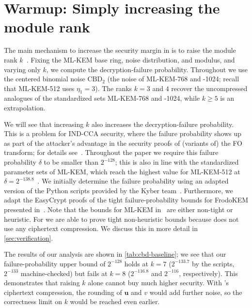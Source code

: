 \section{Warmup: Simply increasing the module rank}
\label{sec:warmup}
The main mechanism to increase the security margin in \kyber is to raise
the module rank $k$~\cite{kyberround1}. Fixing the ML-KEM base ring, noise distribution, and
modulus, and varying only $k$, we compute the decryption-failure probability.
Throughout we use the centered binomial noise $\mathrm{CBD}_2$
(the noise of ML-KEM-768 and -1024; recall that ML-KEM-512 uses $\eta_1=3$).
The ranks $k=3$ and $4$ recover the uncompressed analogues of the standardized sets ML-KEM-768 and -1024,
while $k \geq 5$ is an extrapolation.


We will see that increasing $k$ also increases the decryption-failure
probability. This is a problem for IND-CCA security, where the failure
probability shows up as part of the attacker's advantage in the security proofs of
(variants of) the FO transform; for details see~\cite{TCC:HofHovKil17}.
Throughout the paper we require this
failure probability $\delta$ to be smaller than $2^{-128}$; this is also
in line with the standardized parameter sets of ML-KEM, which reach the
highest value for ML-KEM-512 at $\delta = 2^{-138.8}$~\cite[Table~1]{fips203}.
We initially determine the failure probability using an adapted version
of the Python scripts provided by the Kyber team~\cite{kyber-scripts}.
Furthermore, we adapt the EasyCrypt proofs of the tight failure-probability 
bounds for FrodoKEM presented in~\cite{CCS:BKLSS25}. Note that the bounds
for ML-KEM in~\cite{CCS:BKLSS25} are either non-tight or heuristic. 
For \kaiburr we are able to prove tight non-heuristic bounds because 
\kaiburr does not use any ciphertext compression. 
We discuss this in more detail in \cref{sec:verification}.

The results of our analysis are shown in \cref{tab:cbd-baseline}; we see
that our failure-probability upper bound of $2^{-128}$ 
holds at $k=7$ ($2^{-133.7}$ by the scripts, $2^{-133}$
machine-checked) but fails at $k=8$ ($2^{-116.8}$ and $2^{-116}$, 
respectively). This demonstrates that raising
$k$ alone cannot buy much higher security.
With \kyber's ciphertext compression, the rounding of $\mathbf{u}$ and $v$ would add
further noise, so the correctness limit on $k$ would be reached even earlier.

